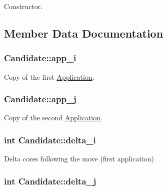 Constructor. 



\subsection{Member Data Documentation}
\hypertarget{classCandidate_ac0132d260daf989781ac94fdf494d507}{
\subsubsection[{app\-\_\-i}]{ Candidate\-::app\-\_\-i}}\label{classCandidate_ac0132d260daf989781ac94fdf494d507}


Copy of the first \hyperlink{classApplication}{Application}. 

\hypertarget{classCandidate_ad420293664ad21ac74713b90bfa73f04}{
\subsubsection[{app\-\_\-j}]{ Candidate\-::app\-\_\-j}}\label{classCandidate_ad420293664ad21ac74713b90bfa73f04}


Copy of the second \hyperlink{classApplication}{Application}. 

\hypertarget{classCandidate_ab1033e1f3e0060f0773c7d9268c2ce0b}{
\subsubsection[{delta\-\_\-i}]{\setlength{\rightskip}{0pt plus 5cm}int Candidate\-::delta\-\_\-i}}\label{classCandidate_ab1033e1f3e0060f0773c7d9268c2ce0b}


Delta cores following the move (first application) 

\hypertarget{classCandidate_a02528143e2448bfcad797aae2fe1ac90}{
\subsubsection[{delta\-\_\-j}]{\setlength{\rightskip}{0pt plus 5cm}int Candidate\-::delta\-\_\-j}}\label{classCandidate_a02528143e2448bfcad797aae2fe1ac90}



